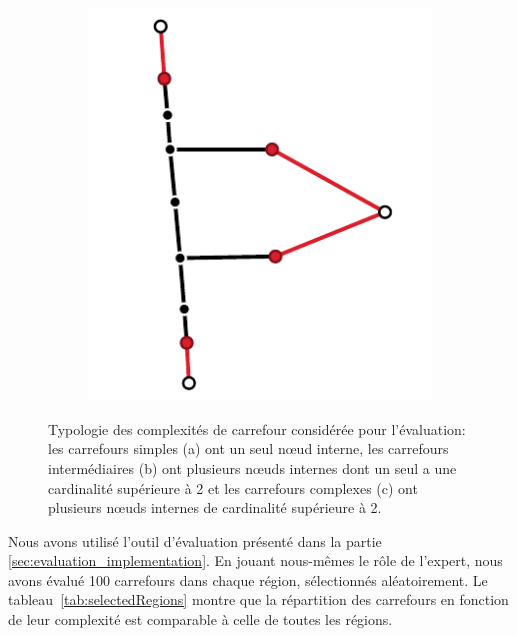 \begin{figure}[ht]
\begin{subfigure}[t]{.25\linewidth}
        \caption{}
    \end{subfigure}
    \begin{subfigure}[t]{.25\linewidth}
        \centering
        \includegraphics[width=\linewidth]{images/evaluation/crseg/carrefour_complexe.pdf}
        \caption{}
    \end{subfigure}
    \caption[Typologie des complexités de carrefour]{Typologie des complexités de carrefour considérée pour l'évaluation: les carrefours simples (a) ont un seul nœud interne, les carrefours intermédiaires (b) ont plusieurs nœuds internes dont un seul a une cardinalité supérieure à 2 et les carrefours complexes (c) ont plusieurs nœuds internes de cardinalité supérieure à 2.}
    \label{fig:carrefours_simple_intermediaire_complexe}
\end{figure}

\newpar{}

Nous avons utilisé l'outil d'évaluation présenté dans la partie \ref{sec:evaluation_implementation}. En jouant nous-mêmes le rôle de l'expert, nous avons évalué 100 carrefours dans chaque région, sélectionnés aléatoirement. Le tableau~\ref{tab:selectedRegions} montre que la répartition des carrefours en fonction de leur complexité est comparable à celle de toutes les régions. 

